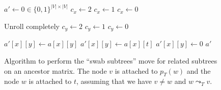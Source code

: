 \begin{figure}[p]
    \begin{algorithmic}[1]
        \State $a' \leftarrow 0 \in \{0,1\}^{|V| \times |V|}$
                \State $c_x \leftarrow 2$
                \State $c_x \leftarrow 1$
            \Else
                \State $c_x \leftarrow 0$
            \EndIf

             \Comment Unroll completely
                    \State $c_y \leftarrow 2$
                    \State $c_y \leftarrow 1$
                \Else
                    \State $c_y \leftarrow 0$
                \EndIf

                    \State $a'[x][y] \leftarrow a[x][y]$
                    \State $a'[x][y] \leftarrow a[x][t]$
                \Else
                    \State $a'[x][y] \leftarrow 0$
                \EndIf
            \EndFor
        \EndFor
        \State \Return $a'$
        \EndFunction
    \end{algorithmic}
    \caption{Algorithm to perform the ``swab subtrees'' move for related subtrees on an ancestor matrix. The node $v$ is attached to $p_T(w)$ and the node $w$ is attached to $t$, assuming that we have $v \neq w$ and $w \leadsto_T v$.}
    \label{alg:am_swap_related}
\end{figure}

